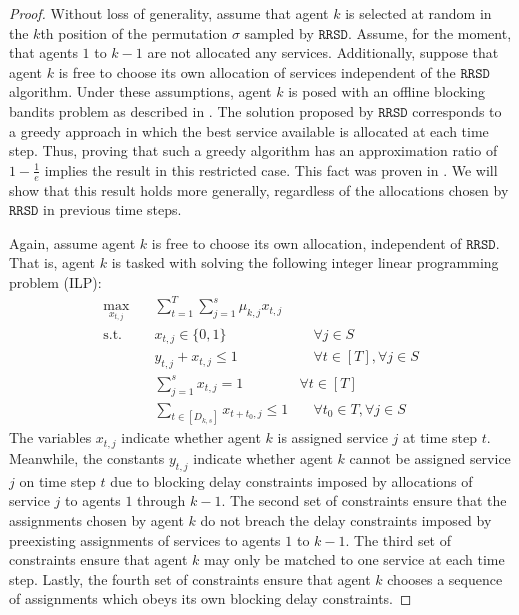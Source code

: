 \documentclass[letterpaper,11pt]{article}
\begin{document}
\begin{proof}
    Without loss of generality, assume that agent $k$ is selected at random in the $k$th position of the permutation $\sigma$ sampled by $\texttt{RRSD}$. Assume, for the moment, that agents $1$ to $k-1$ are not allocated any services. Additionally, suppose that agent $k$ is free to choose its own allocation of services independent of the $\texttt{RRSD}$ algorithm. Under these assumptions, agent $k$ is posed with an offline blocking bandits problem as described in \cite{Basu:2019ui}. The solution proposed by $\texttt{RRSD}$ corresponds to a greedy approach in which the best service available is allocated at each time step. Thus, proving that such a  greedy algorithm has an approximation ratio of $1 - \frac{1}{e}$ implies the result in this restricted case. This fact was proven in \cite{Basu:2019ui}. We will show that this result holds more generally, regardless of the allocations chosen by $\texttt{RRSD}$ in previous time steps. 
    
    
    Again, assume agent $k$ is free to choose its own allocation, independent of $\texttt{RRSD}$. That is, agent $k$ is tasked with solving the following integer linear programming problem (ILP):
    \begin{align*}
        \max_{x_{t,j}}\quad & \sum^{T}_{t=1}\sum^{s}_{j=1}\mu_{k,j}x_{t, j}  \\
        \text{s.t. }\quad &  x_{t, j} \in \{0, 1\} &\quad \forall j \in S \\
        \quad & y_{t, j} + x_{t, j} \leq 1 &\quad \forall t \in [T], \forall j \in S \\
        &\sum^{s}_{j=1}x_{t, j} = 1 \quad &\forall t \in [T] \\
        &\sum_{t \in [D_{k, s}]}x_{t + t_{0}, j} \leq 1 &\quad \forall t_{0} \in T, \forall j \in S
    \end{align*}
    The variables $x_{t, j}$ indicate whether agent $k$ is assigned service $j$ at time step $t$. Meanwhile, the constants $y_{t, j}$ indicate whether agent $k$ cannot be assigned service $j$ on time step $t$ due to blocking delay constraints imposed by allocations of service $j$ to agents $1$ through $k-1$. The second set of constraints ensure that the assignments chosen by agent $k$ do not breach the delay constraints imposed by preexisting assignments of services to agents $1$ to $k-1$. The third set of constraints ensure that agent $k$ may only be matched to one service at each time step. Lastly, the fourth set of constraints ensure that agent $k$ chooses a sequence of assignments which obeys its own blocking delay constraints.
    

\end{proof}
\end{document}
